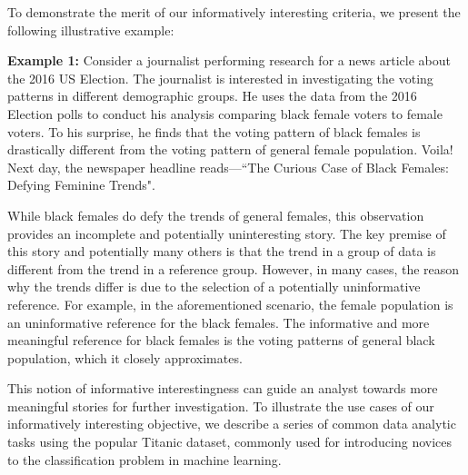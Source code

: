 To demonstrate the merit of our informatively interesting criteria, we present the following illustrative example: 

\par \textbf{Example 1:} Consider a journalist performing research for a news article about the 2016 US Election. The journalist is interested in investigating the voting patterns in different demographic groups. He uses the data from the 2016 Election polls to conduct his analysis comparing black female voters to female voters. To his surprise, he finds that the voting pattern of black females is drastically different from the voting pattern of general female population. Voila! Next day, the newspaper headline reads---``The Curious Case of Black Females: Defying Feminine Trends". 

While black females do defy the trends of general females, this observation provides an incomplete and potentially uninteresting story. The key premise of this story and potentially many others is that the trend in a group of data is different from the trend in a reference group. However, in many cases, the reason why the trends differ is due to the selection of a potentially uninformative reference. For example, in the aforementioned scenario, the female population is an uninformative reference for the black females. The informative and more meaningful reference for black females is the voting patterns of general black population, which it closely approximates.

This notion of informative interestingness can guide an analyst towards more meaningful stories for further investigation. To illustrate the use cases of our informatively interesting objective, we describe a series of common data analytic tasks using the popular Titanic dataset, commonly used for introducing novices to the classification problem in machine learning\cite{titanic}.



